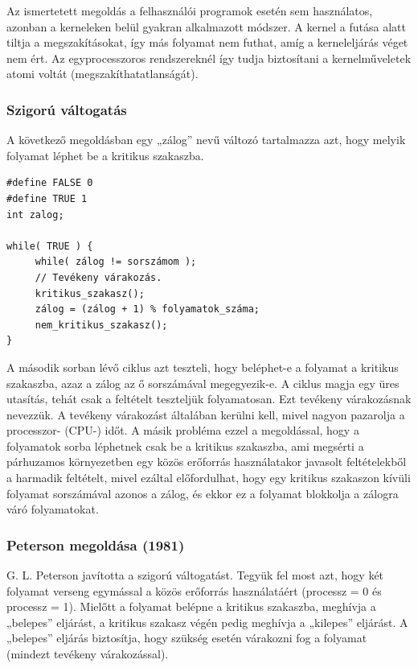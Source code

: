 \documentclass[tikz,12pt,margin=0px]{article}
\begin{document}
    \noindent Az ismertetett megoldás a felhasználói programok esetén sem használatos, azonban a kerneleken belül gyakran alkalmazott módszer. A kernel a futása alatt tiltja a megszakításokat, így más folyamat nem futhat, amíg a kerneleljárás véget nem ért. Az egyprocesszoros rendszereknél így tudja biztosítani a kernelműveletek atomi voltát (megszakíthatatlanságát).

    \subsubsection*{Szigorú váltogatás}

    A következő megoldásban egy „zálog” nevű változó tartalmazza azt, hogy melyik folyamat léphet be a kritikus szakaszba.
    {\small
   \begin{verbatim}
#define FALSE 0
#define TRUE 1
int zalog;

while( TRUE ) {
     while( zálog != sorszámom );
     // Tevékeny várakozás.
     kritikus_szakasz();
     zálog = (zálog + 1) % folyamatok_száma;
     nem_kritikus_szakasz();
}\end{verbatim}
}

    \noindent A második sorban lévő ciklus azt teszteli, hogy beléphet-e a folyamat a kritikus szakaszba, azaz a zálog az ő sorszámával megegyezik-e. A ciklus magja egy üres utasítás, tehát csak a feltételt teszteljük folyamatosan. Ezt tevékeny várakozásnak nevezzük. A tevékeny várakozást általában kerülni kell, mivel nagyon pazarolja a processzor- (CPU-) időt. A másik probléma ezzel a megoldással, hogy a folyamatok sorba léphetnek csak be a kritikus szakaszba, ami megsérti a párhuzamos környezetben egy közös erőforrás használatakor javasolt feltételekből a harmadik feltételt, mivel ezáltal előfordulhat, hogy egy kritikus szakaszon kívüli folyamat sorszámával azonos a zálog, és ekkor ez a folyamat blokkolja a zálogra váró folyamatokat.

    \subsubsection*{Peterson megoldása (1981)}

    G. L. Peterson javította a szigorú váltogatást. Tegyük fel most azt, hogy két folyamat verseng egymással a közös erőforrás használatáért (processz = 0 és processz = 1). Mielőtt a folyamat belépne a kritikus szakaszba, meghívja a „belepes” eljárást, a kritikus szakasz végén pedig meghívja a „kilepes” eljárást. A „belepes” eljárás biztosítja, hogy szükség esetén várakozni fog a folyamat (mindezt tevékeny várakozással).
\end{document}

